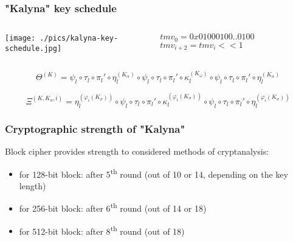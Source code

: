 \documentclass[12pt,mathserif]{beamer}
\begin{document}
	\begin{frame}
		\frametitle {"Kalyna" key schedule}
		
		\begin{columns}[c]
			\begin{column}{.60\textwidth}
				\texttt{[image: ./pics/kalyna-key-schedule.jpg]}
			\end{column}

			\begin{column}{.36\textwidth}

				\begin{scriptsize}
				
				$tmv_0 = 0x01000100..0100$
				$tmv_{i+2} = tmv_i << 1$
				
				\end{scriptsize}
				
			\end{column}

		\end{columns}		
		
			

		\begin{scriptsize}
		
			\begin{equation*}
\Theta^{(K)}=\psi_l \circ \tau_l \circ \pi_l ' \circ \eta^{(K_\alpha)}_l \circ
\psi_l \circ \tau_l \circ \pi_l ' \circ \kappa^{(K_\omega)}_l \circ
\psi_l \circ \tau_l \circ \pi_l ' \circ \eta^{(K_\alpha)}_l 
			\end{equation*}				

			\begin{equation*}
\Xi^{(K, K_\sigma, i)}= \eta^{(\varphi_i (K_\sigma) )}_l \circ 
\psi_l \circ \tau_l \circ \pi_l ' \circ
\kappa^{(\varphi_i (K_\sigma) )}_l \circ 
\psi_l \circ \tau_l \circ \pi_l ' \circ \eta^{(\varphi_i (K_\sigma) )}_l 
			\end{equation*}				

	\end{scriptsize}
	
	\end{frame}
	
	\begin{frame}
		\frametitle{Cryptographic strength of "Kalyna"}
		Block cipher provides strength to considered methods of cryptanalysis:
		\begin{itemize}
			\item for 128-bit block: after 5\textsuperscript{th} round (out of 10 or 14, depending on the key length)
			\item for 256-bit block: after 6\textsuperscript{th} round (out of 14 or 18)
			\item for 512-bit block: after 8\textsuperscript{th} round (out of 18)
		\end{itemize}
	\end{frame}
	
\end{document}
